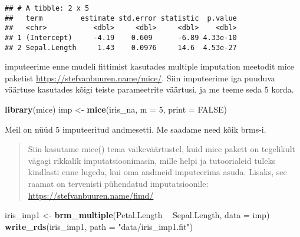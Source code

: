 \documentclass[]{article}
\newenvironment{Shaded}{\begin{snugshade}}{\end{snugshade}}
\newcommand{\KeywordTok}[1]{\textcolor[rgb]{0.13,0.29,0.53}{\textbf{#1}}}
\newcommand{\DataTypeTok}[1]{\textcolor[rgb]{0.13,0.29,0.53}{#1}}
\newcommand{\DecValTok}[1]{\textcolor[rgb]{0.00,0.00,0.81}{#1}}
\newcommand{\StringTok}[1]{\textcolor[rgb]{0.31,0.60,0.02}{#1}}
\newcommand{\OtherTok}[1]{\textcolor[rgb]{0.56,0.35,0.01}{#1}}
\newcommand{\OperatorTok}[1]{\textcolor[rgb]{0.81,0.36,0.00}{\textbf{#1}}}
\newcommand{\NormalTok}[1]{#1}
\begin{document}
\begin{Shaded}
\end{Shaded}

\begin{verbatim}
## # A tibble: 2 x 5
##   term         estimate std.error statistic  p.value
##   <chr>           <dbl>     <dbl>     <dbl>    <dbl>
## 1 (Intercept)     -4.19    0.609      -6.89 4.33e-10
## 2 Sepal.Length     1.43    0.0976     14.6  4.53e-27
\end{verbatim}

imputeerime enne mudeli fittimist kasutades multiple imputation meetodit
mice paketist \url{https://stefvanbuuren.name/mice/}. Siin imputeerime
iga puuduva väärtuse kasutades kõigi teiste parameetrite väärtusi, ja me
teeme seda 5 korda.

\begin{Shaded}
\begin{Highlighting}[]
\KeywordTok{library}\NormalTok{(mice)}
\NormalTok{imp <-}\StringTok{ }\KeywordTok{mice}\NormalTok{(iris_na, }\DataTypeTok{m =} \DecValTok{5}\NormalTok{, }\DataTypeTok{print =} \OtherTok{FALSE}\NormalTok{)}
\end{Highlighting}
\end{Shaded}

Meil on nüüd 5 imputeeritud andmesetti. Me saadame need kõik brms-i.

\begin{quote}
Siin kasutame mice() tema vaikeväärtustel, kuid mice pakett on
tegelikult vägagi rikkalik imputatsioonimasin, mille helpi ja
tutoorialeid tuleks kindlasti enne lugeda, kui oma andmeid imputeerima
asuda. Lisaks, see raamat on tervenisti pühendatud imputatsioonile:
\url{https://stefvanbuuren.name/fimd/}
\end{quote}

\begin{Shaded}
\begin{Highlighting}[]
\NormalTok{iris_imp1 <-}\StringTok{ }\KeywordTok{brm_multiple}\NormalTok{(Petal.Length }\OperatorTok{~}\StringTok{ }\NormalTok{Sepal.Length, }\DataTypeTok{data =}\NormalTok{ imp)}
\KeywordTok{write_rds}\NormalTok{(iris_imp1, }\DataTypeTok{path =} \StringTok{"data/iris_imp1.fit"}\NormalTok{)}
\end{Highlighting}
\end{Shaded}
\end{document}
